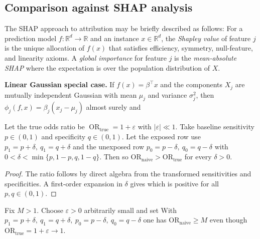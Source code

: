 \documentclass[lineno]{biometrika}
\begin{document}
\subsection{Comparison against SHAP analysis} The SHAP approach to attribution may be briefly described as follows: For a prediction model $f:\mathbb R^{d}\to\mathbb R$ and an instance $x\in\mathbb R^{d}$, the \emph{Shapley value} of feature $j$
is
the unique allocation of $f(x)$ that satisfies efficiency, symmetry,
null-feature, and linearity axioms.
A \emph{global importance} for feature $j$ is the
\emph{mean-absolute SHAP}
where the expectation is over the population distribution of $X$.

\textbf{Linear Gaussian special case.}
If $f(x)=\beta^{\top}x$ and the components $X_{j}$ are mutually
independent Gaussian with mean $\mu_{j}$ and variance $\sigma_{j}^{2}$,
then $\phi_{j}(f,x)=\beta_{j}(x_{j}-\mu_{j})$ almost surely and
%
\begin{lemma}
\label{lem:minimal}
Let the true odds ratio be $\operatorname{OR}_{\mathrm{true}}=1+\varepsilon$
with $|\varepsilon|\ll1$.  
Take baseline sensitivity $p\in(0,1)$ and specificity $q\in(0,1)$.  
Let the exposed row use $p_1=p+\delta,\ q_1=q+\delta$ and the unexposed row
$p_0=p-\delta,\ q_0=q-\delta$ with $0<\delta<\min\{p,1-p,q,1-q\}$.  
Then
so $\mathrm{OR}_{\text{naive}}>\mathrm{OR}_{\text{true}}$ for every $\delta>0$.
\end{lemma}

\begin{proof}
The ratio follows by direct algebra from the transformed sensitivities
and specificities. A first-order expansion in $\delta$ gives
which is positive for all $p,q\in(0,1)$.
\end{proof}

\begin{corollary}\label{corshap}
Fix $M>1$. Choose $\varepsilon>0$ arbitrarily small and set
With $p_1=p+\delta,\ q_1=q+\delta,\ p_0=p-\delta,\ q_0=q-\delta$ one has
$\mathrm{OR}_{\text{naive}}\ge M$ even though $\mathrm{OR}_{\text{true}}=1+\varepsilon\to1$.
\end{corollary}
\end{document}

